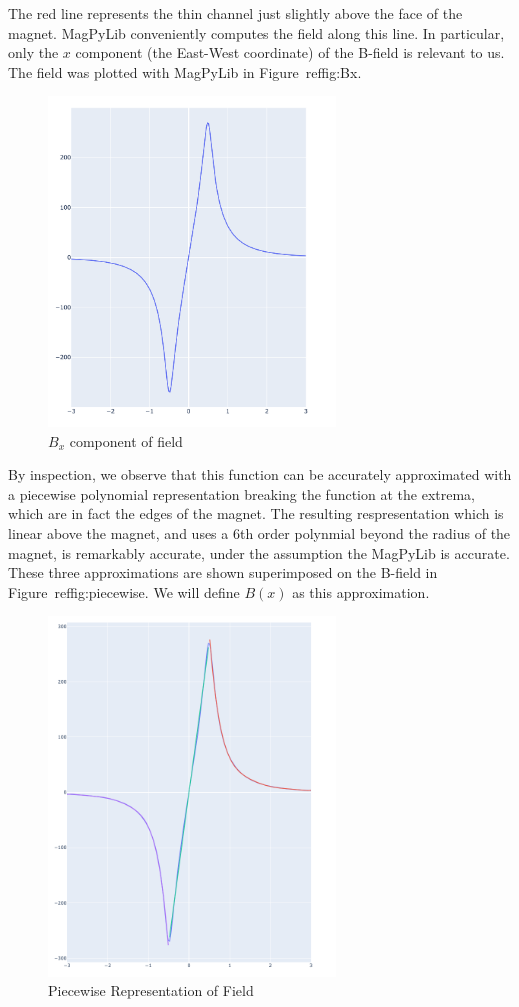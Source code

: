 \documentclass[]{asme2ej}
\begin{document}
The red line represents the thin channel just slightly above the face of
the magnet.
MagPyLib conveniently computes the field along this line. In particular,
only the $x$ component (the East-West coordinate) of the B-field is relevant to us.
The field was plotted with MagPyLib in Figure~ref{fig:Bx}.

\begin{figure}
\centerline{\includegraphics[width=3in]{figure/Bx.png}}
\caption{$B_x$ component of field}
\label{fig:Bx}
\end{figure}

By inspection, we observe that this function can be accurately approximated with
a piecewise polynomial representation breaking the function at the extrema,
which
are in fact the edges of the magnet.
The resulting respresentation which is linear above the magnet,
and uses a 6th order polynmial beyond the radius of the magnet,
is remarkably accurate, under the assumption the MagPyLib is accurate. These
three approximations are shown superimposed on the B-field in Figure~ref{fig:piecewise}. We will define $B(x)$ as this approximation.

\begin{figure}
\centerline{\includegraphics[width=3in]{figure/PlotOfBxWithPieceWiseInterpolation.png}}
\caption{Piecewise Representation of Field}
\label{fig:piecewise}
\end{figure}
\end{document}
